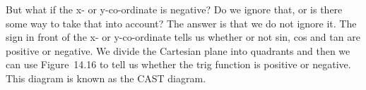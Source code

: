     \label{m39411*eip-102}But what if the x- or y-co-ordinate is negative? Do we ignore that, or is there some way to take that into account? The answer is that we do not ignore it. The sign in front of the x- or y-co-ordinate tells us whether or not sin, cos and tan are positive or negative. We divide the Cartesian plane into quadrants and then we can use Figure~14.16 to tell us whether the trig function is positive or negative. This diagram is known as the CAST diagram.\par \label{m39411*eip-216}
    \setcounter{subfigure}{0}


